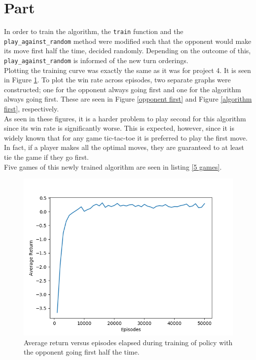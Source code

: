 \documentclass{article}
\newcommand{\enterproblemHeader}[1]{
}
\newcommand{\exitproblemHeader}[1]{
}
\newcounter{problem} %
\newcommand{\problemName}{}
\newenvironment{problem}[1][Part \theproblem]{ %
	\stepcounter{problem} %
	\renewcommand{\problemName}{#1} %
	\section{\problemName} %
	\enterproblemHeader{\problemName} %
}{
	\exitproblemHeader{\problemName} %
}
\begin{document}
\begin{problem}
In order to train the algorithm, the \texttt{train} function and the \texttt{play\_against\_random} method were modified such that the opponent would make its move first half the time, decided randomly. Depending on the outcome of this, \texttt{play\_against\_random} is informed of the new turn orderings.\\

Plotting the training curve was exactly the same as it was for project 4. It is seen in Figure \ref{bonus training curve}. To plot the win rate across episodes, two separate graphs were constructed; one for the opponent always going first and one for the algorithm always going first. These are seen in Figure \ref{opponent first} and Figure \ref{algorithm first}, respectively.\\

As seen in these figures, it is a harder problem to play second for this algorithm since its win rate is significantly worse. This is expected, however, since it is widely known that for any game tic-tac-toe it is preferred to play the first move. In fact, if a player makes all the optimal moves, they are guaranteed to at least tie the game if they go first. \\

Five games of this newly trained algorithm are seen in listing \ref{5 games}.\\

\begin{figure}
		\includegraphics[width=\linewidth]{bonus_a_training.png}
		\caption{Average return versus episodes elapsed during training of policy with the opponent going first half the time.}
		\label{bonus training curve}
\end{figure}


\end{problem}
\end{document}
